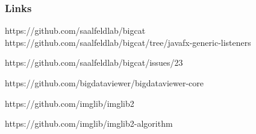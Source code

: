 \documentclass[aspectratio=169,table]{beamer}
\begin{document}
\begin{frame}
    \frametitle{Links}
    \centering
    \scriptsize
    \begin{description}[leftmargin=3.5cm,style=multiline,font=\scriptsize]
          \item[BigCAT] https://github.com/saalfeldlab/bigcat
               https://github.com/saalfeldlab/bigcat/tree/javafx-generic-listeners
          \item[Rename BigCAT] https://github.com/saalfeldlab/bigcat/issues/23
          \item[BigDataViewer] https://github.com/bigdataviewer/bigdataviewer-core
          \item[imglib2] https://github.com/imglib/imglib2
          \item[imglib2-algorithm] https://github.com/imglib/imglib2-algorithm
    \end{description}
\end{frame}
\end{document}
